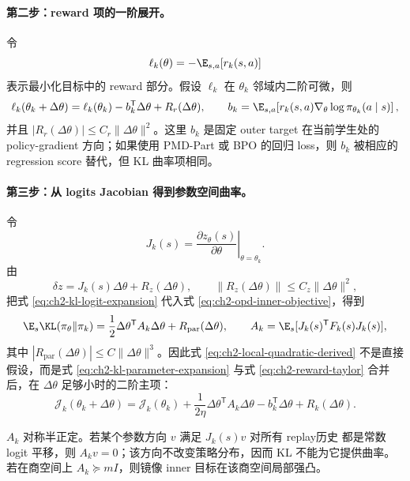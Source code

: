 \paragraph*{第二步：reward 项的一阶展开。}
令
\[
\ell_k(\theta)
=
-\E_{s,a}[r_k(s,a)]
\]
表示最小化目标中的 reward 部分。假设 $\ell_k$ 在 $\theta_k$ 邻域内二阶可微，则
\begin{equation}
\label{eq:ch2-reward-taylor}
\ell_k(\theta_k+\Delta\theta)
=
\ell_k(\theta_k)
-b_k^{\mathsf T}\Delta\theta
+R_r(\Delta\theta),
\qquad
b_k=\E_{s,a}\!\left[
r_k(s,a)\nabla_\theta\log\pi_{\theta_k}(a\mid s)
\right],
\end{equation}
并且 $|R_r(\Delta\theta)|\leq C_r\|\Delta\theta\|^2$。这里 $b_k$ 是固定 outer target 在当前学生处的 policy-gradient 方向；如果使用 PMD-Part 或 BPO 的回归 loss，则 $b_k$ 被相应的 regression score 替代，但 KL 曲率项相同。

\paragraph*{第三步：从 logits Jacobian 得到参数空间曲率。}
令
\[
J_k(s)=\left.\frac{\partial z_\theta(s)}{\partial\theta}\right|_{\theta=\theta_k}.
\]
由
\[
\delta z
=
J_k(s)\Delta\theta+R_z(\Delta\theta),
\qquad
\|R_z(\Delta\theta)\|\leq C_z\|\Delta\theta\|^2,
\]
把式 \eqref{eq:ch2-kl-logit-expansion} 代入式 \eqref{eq:ch2-opd-inner-objective}，得到
\begin{equation}
\label{eq:ch2-kl-parameter-expansion}
\E_s\KL(\pi_\theta\Vert\pi_k)
=
\frac12\Delta\theta^{\mathsf T}A_k\Delta\theta
+R_{\mathrm{par}}(\Delta\theta),
\qquad
A_k=\E_s[J_k(s)^{\mathsf T}F_k(s)J_k(s)],
\end{equation}
其中 $|R_{\mathrm{par}}(\Delta\theta)|\leq C\|\Delta\theta\|^3$。因此式 \eqref{eq:ch2-local-quadratic-derived} 不是直接假设，而是式 \eqref{eq:ch2-kl-parameter-expansion} 与式 \eqref{eq:ch2-reward-taylor} 合并后，在 $\Delta\theta$ 足够小时的二阶主项：
\begin{equation}
\label{eq:ch2-local-quadratic-derived}
\mathcal J_k(\theta_k+\Delta\theta)
=
\mathcal J_k(\theta_k)
+\frac{1}{2\eta}\Delta\theta^{\mathsf T}A_k\Delta\theta
-b_k^{\mathsf T}\Delta\theta
+R_k(\Delta\theta).
\end{equation}

\begin{proposition}[局部曲率的正半定性与不可辨识方向]
\label{prop:ch2-local-curvature}
$A_k$ 对称半正定。若某个参数方向 $v$ 满足 $J_k(s)v$ 对所有 replay历史 都是常数 logit 平移，则 $A_kv=0$；该方向不改变策略分布，因而 KL 不能为它提供曲率。若在商空间上 $A_k\succeq mI$，则镜像 inner 目标在该商空间局部强凸。
\end{proposition}

